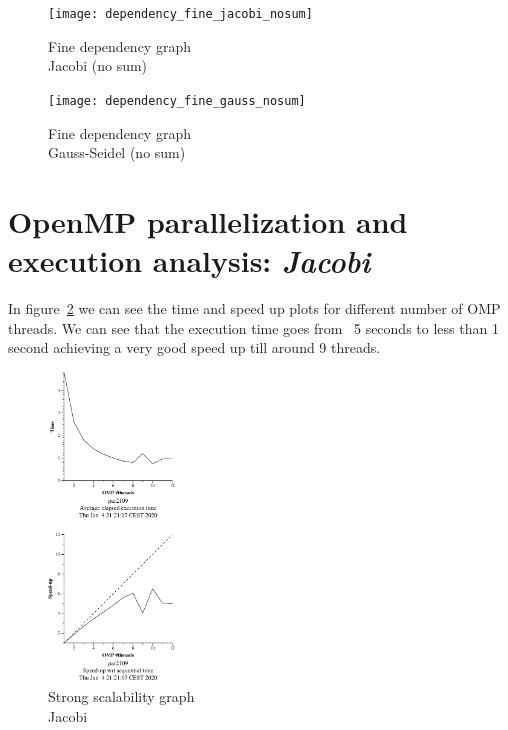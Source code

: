 \begin{figure}[H]
    \begin{minipage}{0.5\textwidth}
        \centering
        \texttt{[image: dependency\_fine\_jacobi\_nosum]}
        \caption{Fine dependency graph \\ Jacobi (no sum)}%
        \label{fig:dependency_fine_jacobi_nosum}
    \end{minipage}
    \begin{minipage}{0.5\textwidth}
        \centering
        \texttt{[image: dependency\_fine\_gauss\_nosum]}
        \caption{Fine dependency graph \\ Gauss-Seidel (no sum)}%
        \label{fig:dependency_fine_gauss_nosum}
    \end{minipage}
\end{figure}

\section{OpenMP parallelization and execution analysis: \emph{Jacobi}}

In figure~\ref{fig:strong-jacobi} we can see the time and speed up plots for different number 
of OMP threads. We can see that the execution time goes from ~5 seconds to less than 1 second
achieving a very good speed up till around 9 threads.


\begin{figure}[H]
    \centering
    \includegraphics[width=0.3\textwidth]{heat-omp-strong-jacobi-crop}
    \caption{Strong scalability graph \\ Jacobi}%
    \label{fig:strong-jacobi}
\end{figure}
